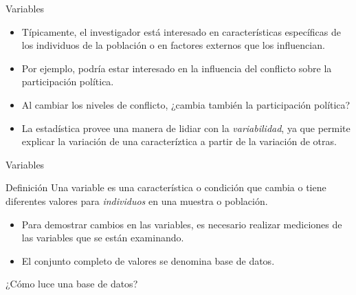 \documentclass[xcolor=dvipsnames]{beamer}
\begin{document}
\begin{frame}{Variables}
\begin{itemize}
\justifying
\item Típicamente, el investigador está interesado en características específicas de los individuos de la población o en factores externos que los influencian. 
\item Por ejemplo, podría estar interesado en la influencia del conflicto sobre la participación política.
\item Al cambiar los niveles de conflicto, ¿cambia también la participación política?
\item La estadística provee una manera de lidiar con la \emph{variabilidad}, ya que permite explicar la variación de una caracteríztica a partir de la variación de otras. 
\end{itemize}
\end{frame}

\begin{frame}{Variables}
	\begin{block}{Definición}
		\centering
Una variable es una característica o condición que cambia o tiene diferentes valores para \emph{individuos} en una muestra o población. 
	\end{block}
	\begin{itemize}
\justifying
\item Para demostrar cambios en las variables, es necesario realizar mediciones de las variables que se están examinando. 
\item El conjunto completo de valores se denomina base de datos. 
	\end{itemize}
\end{frame}

\begin{frame}{¿Cómo luce una base de datos?}
\begin{center}
\begin{table}[H]
\end{table}
\end{center}
\end{frame}
\end{document}

